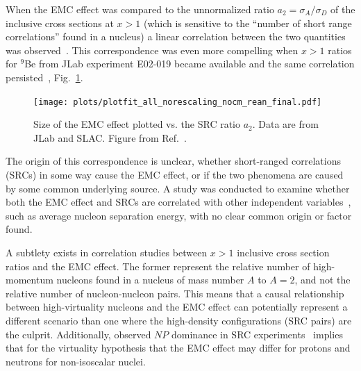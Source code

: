 When the EMC effect was compared to the unnormalized ratio $a_2=\sigma_A/\sigma_D$ of the
inclusive cross sections at $x>1$ (which is sensitive to the ``number of short range correlations''
found in a nucleus) a linear correlation between the two quantities was observed~\cite{Weinstein:2010rt}.
This correspondence was even more compelling when $x>1$ ratios for $^9$Be from JLab experiment E02-019 became
available and the same correlation persisted~\cite{Arrington:2012ax, Hen:2012fm}, Fig.~\ref{fig:emc_src_bff}.

\begin{figure}[tbp]
  \centering\texttt{[image: plots/plotfit\_all\_norescaling\_nocm\_rean\_final.pdf]}
  \caption{Size of the EMC effect plotted vs. the SRC ratio $a_2$. Data are from JLab and SLAC. Figure
  from Ref.~\cite{Arrington:2012ax}.}
  \label{fig:emc_src_bff}
\end{figure}

The origin of this correspondence is unclear, whether short-ranged correlations (SRCs) in some way cause the EMC effect, or if the two
phenomena are caused by some common underlying source.  A study was conducted to examine whether
both the EMC effect and SRCs are correlated with other independent variables~\cite{Arrington:2012ax}, such
as average nucleon separation energy, with no clear common origin or factor found.

A subtlety exists in correlation studies between $x>1$ inclusive cross section ratios and the EMC effect.  The former represent the relative number of high-momentum nucleons found in a nucleus of mass number $A$ to $A=2$, and not the relative number of nucleon-nucleon pairs.  This means that a causal relationship between high-virtuality nucleons and the EMC effect can potentially represent a different scenario than one where the high-density configurations (SRC pairs) are the culprit.  Additionally, observed $NP$ dominance in SRC experiments~\cite{Subedi:2008zz} implies that for the virtuality hypothesis that the EMC effect may differ for protons and neutrons for non-isoscalar nuclei.%


